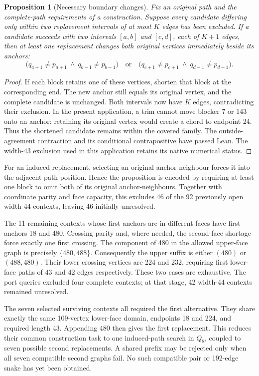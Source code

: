 \documentclass[11pt,a4paper]{article}
\newtheorem{proposition}[theorem]{Proposition}
\theoremstyle{definition}
\theoremstyle{remark}
\begin{document}
\begin{proposition}[Necessary boundary changes]
\label{prop:boundary226}
Fix an original path and the complete-path requirements of a construction.
Suppose every candidate differing only within two replacement intervals
of at most $K$ edges has been excluded. If a candidate succeeds with two
intervals $[a,b]$ and $[c,d]$, each of $K+1$ edges, then at least one
replacement changes both original vertices immediately beside its anchors:
\[
\bigl(q_{a+1}\ne p_{a+1}\ \land\ q_{b-1}\ne p_{b-1}\bigr)
\quad\text{or}\quad
\bigl(q_{c+1}\ne p_{c+1}\ \land\ q_{d-1}\ne p_{d-1}\bigr).
\]
\end{proposition}
\begin{proof}
If each block retains one of these vertices, shorten that block at the
corresponding end. The new anchor still equals its original vertex,
and the complete candidate is unchanged. Both intervals now have $K$
edges, contradicting their exclusion. In the present application, a trim
cannot move blocker 7 or 143 onto an anchor: retaining its original vertex
would create a chord to endpoint 24. Thus the shortened candidate remains
within the covered family. The outside-agreement contraction and its
conditional contrapositive have passed Lean. The width-43 exclusion used
in this application retains its native numerical status.
\end{proof}

For an induced replacement, selecting an original anchor-neighbour forces
it into the adjacent path position. Hence the proposition is encoded by
requiring at least one block to omit both of its original anchor-neighbours.
Together with coordinate parity and face capacity, this excludes 46 of
the 92 previously open width-44 contexts, leaving 46 initially unresolved.

The 11 remaining contexts whose first anchors are in different faces
have first anchors 18 and 480. Crossing parity and, where needed, the
second-face shortage force exactly one first crossing. The component
of 480 in the allowed upper-face graph is precisely $\{480,488\}$.
Consequently the upper suffix is either $(480)$ or $(488,480)$.
Their lower crossing vertices are 224 and 232, requiring first lower-face
paths of 43 and 42 edges respectively. These two cases are exhaustive.
The port queries excluded four complete contexts; at that stage, 42
width-44 contexts remained unresolved.

The seven selected surviving contexts all required the first alternative. They share
exactly the same 109-vertex lower-face domain, endpoints 18 and 224,
and required length 43. Appending 480 then gives the first replacement.
This reduces their common construction task to one induced-path search
in $Q_8$, coupled to seven possible second replacements. A shared prefix
may be rejected only when all seven compatible second graphs fail.
No such compatible pair or 192-edge snake has yet been obtained.
\end{document}
